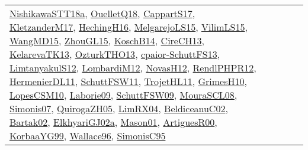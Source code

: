 {\begin{longtable}{lp{3cm}>{\raggedright}p{6cm}>{\raggedright}p{6cm}p{8cm}}
\href{papers/NishikawaSTT18a.pdf}{NishikawaSTT18a}\cite{NishikawaSTT18a}, \href{papers/OuelletQ18.pdf}{OuelletQ18}\cite{OuelletQ18}, \href{papers/CappartS17.pdf}{CappartS17}\cite{CappartS17}, \href{papers/KletzanderM17.pdf}{KletzanderM17}\cite{KletzanderM17}, \href{papers/HechingH16.pdf}{HechingH16}\cite{HechingH16}, \href{papers/MelgarejoLS15.pdf}{MelgarejoLS15}\cite{MelgarejoLS15}, \href{papers/VilimLS15.pdf}{VilimLS15}\cite{VilimLS15}, \href{articles/WangMD15.pdf}{WangMD15}\cite{WangMD15}, \href{papers/ZhouGL15.pdf}{ZhouGL15}\cite{ZhouGL15}, \href{papers/KoschB14.pdf}{KoschB14}\cite{KoschB14}, \href{papers/CireCH13.pdf}{CireCH13}\cite{CireCH13}, \href{papers/KelarevaTK13.pdf}{KelarevaTK13}\cite{KelarevaTK13}, \href{articles/OzturkTHO13.pdf}{OzturkTHO13}\cite{OzturkTHO13}, \href{papers/cpaior-SchuttFS13.pdf}{cpaior-SchuttFS13}\cite{cpaior-SchuttFS13}, \href{articles/LimtanyakulS12.pdf}{LimtanyakulS12}\cite{LimtanyakulS12}, \href{articles/LombardiM12.pdf}{LombardiM12}\cite{LombardiM12}, \href{articles/NovasH12.pdf}{NovasH12}\cite{NovasH12}, \href{papers/RendlPHPR12.pdf}{RendlPHPR12}\cite{RendlPHPR12}, \href{papers/HermenierDL11.pdf}{HermenierDL11}\cite{HermenierDL11}, \href{articles/SchuttFSW11.pdf}{SchuttFSW11}\cite{SchuttFSW11}, \href{articles/TrojetHL11.pdf}{TrojetHL11}\cite{TrojetHL11}, \href{papers/GrimesH10.pdf}{GrimesH10}\cite{GrimesH10}, \href{articles/LopesCSM10.pdf}{LopesCSM10}\cite{LopesCSM10}, \href{papers/Laborie09.pdf}{Laborie09}\cite{Laborie09}, \href{papers/SchuttFSW09.pdf}{SchuttFSW09}\cite{SchuttFSW09}, \href{papers/MouraSCL08.pdf}{MouraSCL08}\cite{MouraSCL08}, \href{articles/Simonis07.pdf}{Simonis07}\cite{Simonis07}, \href{papers/QuirogaZH05.pdf}{QuirogaZH05}\cite{QuirogaZH05}, \href{papers/LimRX04.pdf}{LimRX04}\cite{LimRX04}, \href{papers/BeldiceanuC02.pdf}{BeldiceanuC02}\cite{BeldiceanuC02}, \href{papers/Bartak02.pdf}{Bartak02}\cite{Bartak02}, \href{papers/ElkhyariGJ02a.pdf}{ElkhyariGJ02a}\cite{ElkhyariGJ02a}, \href{articles/Mason01.pdf}{Mason01}\cite{Mason01}, \href{articles/ArtiguesR00.pdf}{ArtiguesR00}\cite{ArtiguesR00}, \href{papers/KorbaaYG99.pdf}{KorbaaYG99}\cite{KorbaaYG99}, \href{articles/Wallace96.pdf}{Wallace96}\cite{Wallace96}, \href{papers/SimonisC95.pdf}{SimonisC95}\cite{SimonisC95}\\

\end{longtable}}
